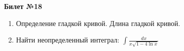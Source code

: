 \documentclass[a4paper, 12pt]{article}
\begin{document}
\begin{center}
	\textbf{Билет №18}
\end{center}
\begin{enumerate}
	\item Определение гладкой кривой. Длина гладкой кривой.
	\item Найти неопределенный интеграл: $\displaystyle \int{\frac{dx}{x \sqrt{1 - 4 \ln x}}}$
\end{enumerate}
\end{document}
